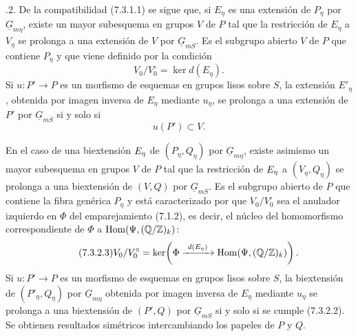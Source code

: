 
\medskip
{}.2. De la compatibilidad (7.3.1.1) se sigue que, si
$E_\eta$ es una extensión de $P_\eta$ por $\underline G_{m\eta}$,
existe un mayor subesquema en grupos $V$ de $P$ tal que la restricción
de $E_\eta$ a $V_\eta$ se prolonga a una extensión de $V$ por
$\underline G_{mS}$. Es el subgrupo abierto $V$ de $P$ que contiene
$P_\eta$ y que viene definido por la condición
\begin{equation}\tag{7.3.2.1}
 V_0/V_0^{\circ}=\ker d(E_\eta).
\end{equation}
Si $u:P'\to P$ es un morfismo de esquemas en grupos lisos sobre $S$,
la extensión $E'_\eta$, obtenida por imagen inversa de $E_\eta$ mediante
$u_\eta$, se prolonga a una extensión de $P'$ por $\underline G_{mS}$
si y solo si
\begin{equation}\tag{7.3.2.2}
 u(P')\subset V.
\end{equation}


En el caso de una biextensión $E_\eta$ de
$(P_\eta,Q_\eta)$ por $\underline G_{m\eta}$, existe asimismo un mayor
subesquema en grupos $V$ de $P$ tal que la restricción de
$E_\eta$ a $(V_\eta,Q_\eta)$ se prolonga a una biextensión de
$(V,Q)$ por $\underline G_{mS}$. Es el subgrupo abierto de $P$ que
contiene la fibra genérica $P_\eta$ y está caracterizado por que
$V_0/V_0^{\circ}$ sea el anulador izquierdo en $\Phi$ del
emparejamiento (7.1.2), es decir, el núcleo del homomorfismo
correspondiente de $\Phi$ a
$\operatorname{Hom}(\Psi,(\mathbb Q/\mathbb Z)_k)$:
\begin{equation}\tag{7.3.2.3}
 V_0/V_0^{\circ}
 =\ker\!\left(
   \Phi\xrightarrow{\ d(E_\eta)\ }
   \operatorname{Hom}(\Psi,(\mathbb Q/\mathbb Z)_k)
 \right).
\end{equation}
Si $u:P'\to P$ es un morfismo de esquemas en grupos lisos sobre $S$,
la biextensión de $(P'_\eta,Q_\eta)$ por $\underline G_{m\eta}$
obtenida por imagen inversa de $E_\eta$ mediante $u_\eta$ se prolonga
a una biextensión de $(P',Q)$ por $\underline G_{mS}$ si y solo si se
cumple (7.3.2.2). Se obtienen resultados simétricos intercambiando los
papeles de $P$ y $Q$.


